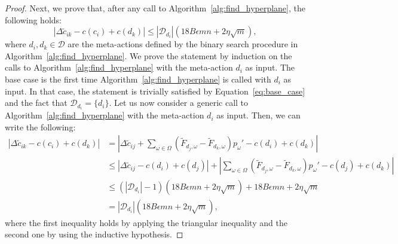 \begin{proof}
	
	Next, we prove that, after any call to Algorithm~\ref{alg:find_hyperplane}, the following holds:
	\[
		\left| \Delta \widetilde{c}_{ik} - c(c_i) + c(d_k) \right| \leq | \mathcal{D}_{d_i} | \left( 18 B \epsilon m n + 2 \eta \sqrt{m}  \right),
	\] 
	where $d_i, d_k \in \mathcal{D}$ are the meta-actions defined by the binary search procedure in Algorithm~\ref{alg:find_hyperplane}.
	We prove the statement by induction on the calls to Algorithm~\ref{alg:find_hyperplane} with the meta-action $d_i$ as input.
	The base case is the first time Algorithm~\ref{alg:find_hyperplane} is called with $d_i$ as input.
	In that case, the statement is trivially satisfied by Equation~\eqref{eq:base_case} and the fact that $\mathcal{D}_{d_i} = \{ d_i \}$.
	Let us now consider a generic call to Algorithm~\ref{alg:find_hyperplane} with the meta-action $d_i$ as input.
	Then, we can write the following:
	\begin{align*}
		\left| \Delta \widetilde{c}_{ik}  - c(c_i) + c(d_k) \right|  &= \left| \Delta \widetilde{c}_{ij}  + \sum_{\omega \in \Omega}  \left(  \widetilde{F}_{d_{j},\omega} -  \widetilde{F}_{d_{k},\omega} \right) p_{\omega}'  - c(d_i) + c(d_k) \right|\\
		& \leq \left| \Delta \widetilde{c}_{ij}  -c(d_i) + c(d_j) \right| + \left| \sum_{\omega \in \Omega}  \left(  \widetilde{F}_{d_{j},\omega} -  \widetilde{F}_{d_{k},\omega} \right) p_{\omega}'  - c(d_j) + c(d_k) \right| \\
		& \leq \left( | \mathcal{D}_{d_i} | -1 \right) \left( 18 B \epsilon m n + 2 \eta \sqrt{m}  \right) + 18 B \epsilon m n + 2 \eta \sqrt{m}  \\
		& = | \mathcal{D}_{d_i} | \left( 18 B \epsilon m n + 2 \eta \sqrt{m}  \right),
	\end{align*}
	where the first inequality holds by applying the triangular inequality and the second one by using the inductive hypothesis.
%
%	
\end{proof}

